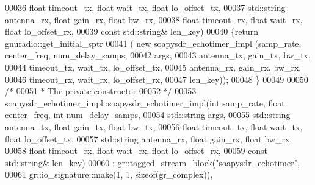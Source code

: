 \begin{DoxyCode}
00036                               \textcolor{keywordtype}{float} timeout\_tx, \textcolor{keywordtype}{float} wait\_tx, \textcolor{keywordtype}{float} lo\_offset\_tx,
00037                               std::string antenna\_rx, \textcolor{keywordtype}{float} gain\_rx, \textcolor{keywordtype}{float} bw\_rx,
00038                               \textcolor{keywordtype}{float} timeout\_rx, \textcolor{keywordtype}{float} wait\_rx, \textcolor{keywordtype}{float} lo\_offset\_rx,
00039                               \textcolor{keyword}{const} std::string& len\_key)
00040       \{\textcolor{keywordflow}{return} gnuradio::get\_initial\_sptr
00041         ( \textcolor{keyword}{new} soapysdr_echotimer_impl (samp\_rate, center\_freq, num\_delay\_samps,
00042                                           args,
00043                                           antenna\_tx, gain\_tx, bw\_tx,
00044                                           timeout\_tx, wait\_tx, lo\_offset\_tx,
00045                                           antenna\_rx, gain\_rx, bw\_rx,
00046                                           timeout\_rx, wait\_rx, lo\_offset\_rx,
00047                                           len\_key));
00048       \}
00049 
00050       \textcolor{comment}{/*}
00051 \textcolor{comment}{      * The private constructor}
00052 \textcolor{comment}{      */}
00053       soapysdr_echotimer_impl::soapysdr_echotimer_impl(\textcolor{keywordtype}{int} samp_rate, \textcolor{keywordtype}{float} 
      center_freq, \textcolor{keywordtype}{int} num_delay_samps,
00054                                                         std::string args,
00055                                                         std::string antenna\_tx, \textcolor{keywordtype}{float} gain\_tx, \textcolor{keywordtype}{float} bw\_tx,
00056                                                         \textcolor{keywordtype}{float} timeout\_tx, \textcolor{keywordtype}{float} 
      wait_tx, \textcolor{keywordtype}{float} lo\_offset\_tx,
00057                                                         std::string antenna\_rx, \textcolor{keywordtype}{float} gain\_rx, \textcolor{keywordtype}{float} bw\_rx,
00058                                                         \textcolor{keywordtype}{float} timeout\_rx, \textcolor{keywordtype}{float} 
      wait_rx, \textcolor{keywordtype}{float} lo\_offset\_rx,
00059                                                         \textcolor{keyword}{const} std::string& len\_key)
00060       : gr::tagged\_stream\_block(\textcolor{stringliteral}{"soapysdr\_echotimer"},
00061       gr::io\_signature::make(1, 1, sizeof(gr\_complex)),

\end{DoxyCode}
